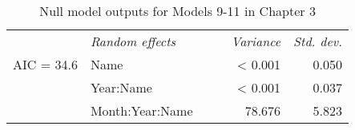 \begin{table}[h!]
{\begin{tabular}{l l r r r r}
        & \textit{Random effects} & & & \textit{Variance} & \textit{Std. dev.}\\
        
    \cline{2-6} 
    
  AIC = 34.6 & Name & & & < 0.001 & 0.050 \\

    & Year:Name & & & < 0.001 & 0.037 \\
    
    & Month:Year:Name & & & 78.676 & 5.823 \\
    
     \hline 
     
\end{tabular}
    }
    \caption{Null model outputs for Models 9-11 in Chapter 3}
\end{table}


